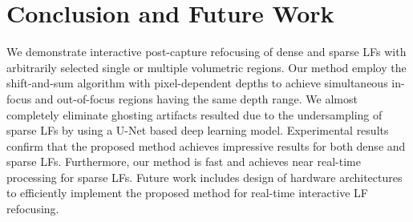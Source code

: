 \section{Conclusion and Future Work}\label{sec:conclusion}

We demonstrate interactive post-capture refocusing of dense and sparse LFs with arbitrarily selected single or multiple volumetric regions. Our method employ the shift-and-sum algorithm with pixel-dependent depths to achieve simultaneous in-focus and out-of-focus regions having the same depth range. We almost completely eliminate ghosting artifacts resulted due to the undersampling of sparse LFs by using a U-Net based deep learning model. Experimental results confirm that the proposed method achieves impressive results for both dense and sparse LFs. Furthermore, our method is fast and achieves near real-time processing for sparse LFs. Future work includes design of hardware architectures to efficiently implement the proposed method for real-time interactive LF refocusing. 

